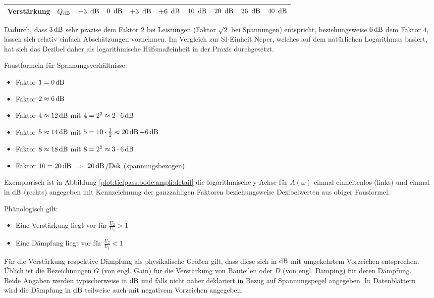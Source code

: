 \begin{frame}
{\begin{table}[H]
\begin{tabular}{ |l c|g|c|g|c|g|c|g|c| }
                \textbf{Verstärkung}       & $Q_{\operatorname{dB}}$     &
                $-3\ \dB$ 			    & $0\ \dB$ 	    & $+3\ \dB$ 	& $+6\ \dB$     & $10\ \dB$     & $20\ \dB$     & $26\ \dB$	    & $40\ \dB$ \\[+3pt]
            \hline
        \end{tabular}
    \end{table}%
    Dadurch, dass $3\operatorname{dB}$ sehr präzise dem Faktor $2$ bei Leistungen (Faktor $\sqrt{2}$ bei Spannungen) entspricht, 
    beziehungsweise $6\operatorname{dB}$ dem Faktor $4$, lassen sich relativ einfach Abschätzungen vornehmen.
    Im Vergleich zur SI-Einheit Neper, welches auf dem natürlichen Logarithmus basiert, 
    hat sich das Dezibel daher als logarithmische Hilfsmaßeinheit in der Praxis durchgesetzt.

    Faustformeln für Spannungsverhältnisse: 
    \begin{itemize}
        \item Faktor $1 = 0\operatorname{dB}$
        \item Faktor $2 \approx 6\operatorname{dB}$
        \item Faktor $4 \approx 12\operatorname{dB}$ \quad mit \quad $4 = 2^2 \approx 2\cdot 6\operatorname{dB}$
        \item Faktor $5 \approx 14\operatorname{dB}$ \quad mit \quad $5 = 10 \cdot \frac{1}{2} \approx 20\operatorname{dB} - 6\operatorname{dB}$
        \item Faktor $8 \approx 18\operatorname{dB}$ \quad mit \quad $8=2^3 \approx 3\cdot 6\operatorname{dB}$
        \item Faktor $10 = 20\operatorname{dB}$ \quad $\Longrightarrow$ \quad $20 \operatorname{dB} / \mathrm{Dek}$ (spannungsbezogen)
    \end{itemize}    
    
    Exemplarisch ist in Abbildung \ref{plot:tiefpass:bode:ampli:detail} die logarithmische y-Achse für $A(\omega)$ 
    einmal einheitenlos (links) und einmal in $\operatorname{dB}$ (rechts) angegeben mit Kennzeichnung der ganzzahligen Faktoren 
    beziehungsweise Dezibelwerten aus obiger Fausformel.
    
    Phänologisch gilt:
    \begin{itemize}
        \item Eine Verstärkung liegt vor für $\frac{U_2}{U_1}>1$
        \item Eine Dämpfung liegt vor für $\frac{U_2}{U_1}<1$
    \end{itemize}
    
    Für die Verstärkung respektive Dämpfung als physikalische Größen gilt, dass diese sich in $\operatorname{dB}$ mit umgekehrtem Vorzeichen entsprechen.
    Üblich ist die Bezeichnungen $G$ (von engl. Gain) für die Verstärkung von Bauteilen oder $D$ (von engl. Damping) für deren Dämpfung.
    Beide Angaben werden typischerweise in $\operatorname{dB}$ und falls nicht näher deklariert in Bezug auf Spannungspegel angegeben.
    In Datenblättern wird die Dämpfung in $\operatorname{dB}$ teilweise auch mit negativem Vorzeichen angegeben.
}

\end{frame}

